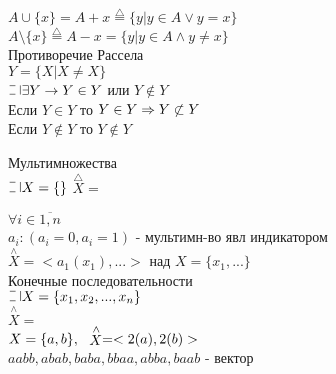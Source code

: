 $ A \cup \{x\} = A + x \stackrel{\triangle}{=} \{ y | y \in A \vee y = x \} $ \\
$ A \setminus \{x\} \stackrel{\triangle}{=} A - x =  \{ y | y \in A \wedge y \neq x \} $ \\
Противоречие Рассела \\
$ Y = \{ X | X \neq X \} $ \\
$ \letus \exists Y \rightarrow Y \in Y $ или $ Y \notin Y $ \\
Если $ Y \in Y $ то $ Y \in Y \Rightarrow Y \centernot\subset Y $ \\
Если $ Y \notin Y $ то $ Y \notin Y $ \\
\begin{definition}
	Мультимножества \\
	$ \letus X = \{  \} $
	$ \stackrel{\triangle}{X} = $ 
\end{definition}

$ \forall i \in \overline{1, n} $ \\
$ a_i : ( a_i = 0, a_i = 1 ) $ - мультимн-во явл индикатором \\
$ \stackrel{\wedge}{X} = < a_1(x_1), ... > $ над $ X = \{x_1, ...\} $ \\
Конечные последовательности \\
$ \letus X = \{x_1, x_2, ..., x_n \} $ \\
$ \stackrel{\wedge}{X} = $\\
$ X = \{a, b\}, \ \ \stackrel{\wedge}{X} = <2(a), 2(b) > $\\
$ aabb, abab, baba, bbaa, abba, baab $ - вектор \\

